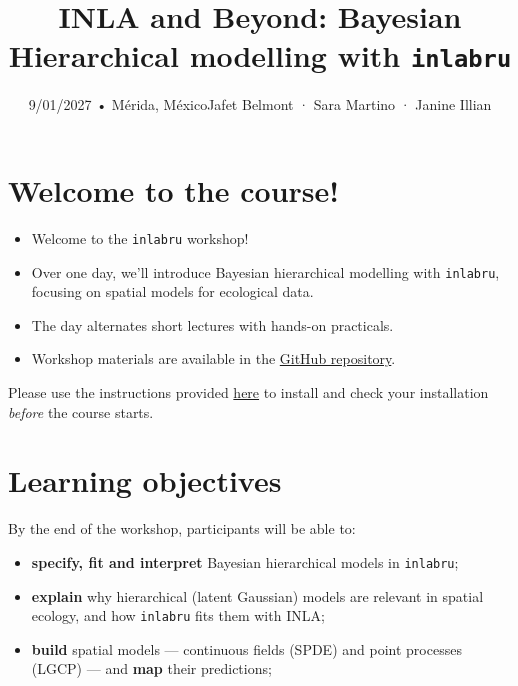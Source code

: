 \documentclass[
  letterpaper,
  DIV=11,
  numbers=noendperiod]{scrartcl}
\title{INLA and Beyond: Bayesian Hierarchical modelling with
\texttt{inlabru}}
\subtitle{9/01/2027 • Mérida, MéxicoJafet Belmont · Sara Martino ·
Janine Illian}
\author{}
\date{}
\makeatletter
\providecommand{\tightlist}{%
  \setlength{\itemsep}{0pt}\setlength{\parskip}{0pt}}
\renewcommand{\maketitle}{\bgroup\setlength{\parindent}{0pt}
\begin{flushleft}
  {\sffamily\huge\textbf{\MakeUppercase{\@title}}} \vspace{0.3cm} \newline
  {\Large {\@subtitle}} \newline
  \@author
\end{flushleft}\egroup
}
\makeatother
\begin{document}
\maketitle

\pagestyle{mystyle}


\section{Welcome to the course!}\label{welcome-to-the-course}

\begin{itemize}
\tightlist
\item
  Welcome to the \texttt{inlabru} workshop!
\item
  Over one day, we'll introduce Bayesian hierarchical modelling with
  \texttt{inlabru}, focusing on spatial models for ecological data.
\item
  The day alternates short lectures with hands-on practicals.
\item
  Workshop materials are available in the
  \href{https://github.com/inlabru-courses/ISEC2027}{GitHub repository}.
\end{itemize}

\begin{tcolorbox}[enhanced jigsaw, arc=.35mm, bottomrule=.15mm, bottomtitle=1mm, breakable, colback=white, colbacktitle=quarto-callout-warning-color!10!white, colframe=quarto-callout-warning-color-frame, coltitle=black, left=2mm, leftrule=.75mm, opacityback=0, opacitybacktitle=0.6, rightrule=.15mm, title=\textcolor{quarto-callout-warning-color}{\faExclamationTriangle}\hspace{0.5em}{Important! ⚠️}, titlerule=0mm, toprule=.15mm, toptitle=1mm]

Please use the instructions provided \href{Install_software.qmd}{here}
to install and check your installation \emph{before} the course starts.

\end{tcolorbox}

\section{Learning objectives}\label{learning-objectives}

By the end of the workshop, participants will be able to:

\begin{itemize}
\tightlist
\item
  \textbf{specify, fit and interpret} Bayesian hierarchical models in
  \texttt{inlabru};
\item
  \textbf{explain} why hierarchical (latent Gaussian) models are
  relevant in spatial ecology, and how \texttt{inlabru} fits them with
  INLA;
\item
  \textbf{build} spatial models --- continuous fields (SPDE) and point
  processes (LGCP) --- and \textbf{map} their predictions;
\end{itemize}
\end{document}
